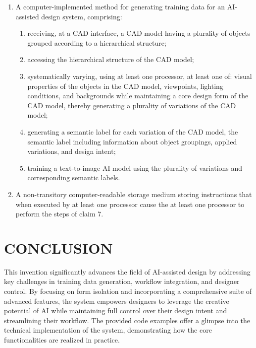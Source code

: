 \documentclass[12pt]{report}
\begin{document}
\begin{center}
\begin{enumerate}
    \item A computer-implemented method for generating training data for an AI-assisted design system, comprising:
        \begin{enumerate}
            \item receiving, at a CAD interface, a CAD model having a plurality of objects grouped according to a hierarchical structure;
            \item accessing the hierarchical structure of the CAD model;
            \item systematically varying, using at least one processor, at least one of: visual properties of the objects in the CAD model, viewpoints, lighting conditions, and backgrounds while maintaining a core design form of the CAD model, thereby generating a plurality of variations of the CAD model;
            \item generating a semantic label for each variation of the CAD model, the semantic label including information about object groupings, applied variations, and design intent;
            \item training a text-to-image AI model using the plurality of variations and corresponding semantic labels.
        \end{enumerate}
    
    \item A non-transitory computer-readable storage medium storing instructions that when executed by at least one processor cause the at least one processor to perform the steps of claim 7. 
    
    \end{enumerate}
    
\section{CONCLUSION}

\end{center}

This invention significantly advances the field of AI-assisted design by addressing key challenges in training data generation, workflow integration, and designer control. By focusing on form isolation and incorporating a comprehensive suite of advanced features, the system empowers designers to leverage the creative potential of AI while maintaining full control over their design intent and streamlining their workflow. The provided code examples offer a glimpse into the technical implementation of the system, demonstrating how the core functionalities are realized in practice. 
\end{document}
